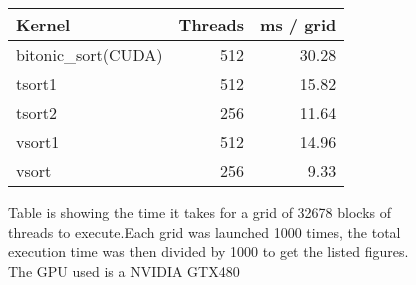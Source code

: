 

\begin{figure}
\begin{center}
  \begin{tabular}{  l | r | r}
    Kernel               & Threads   & ms / grid   \\ \hline
    bitonic\_sort(CUDA)  & 512       & 30.28       \\      
    tsort1               & 512       & 15.82       \\
    tsort2               & 256       & 11.64       \\ 
    vsort1               & 512       & 14.96       \\ 
    vsort                & 256       &  9.33       \\ 
  \end{tabular}
\end{center}
\label{fig:table}
\caption{Table is showing the time it takes for a grid of 32678 blocks of 
threads to execute.Each grid was launched 1000 times, the total execution time 
was then divided by 1000 to get the listed figures. The GPU used is a NVIDIA GTX480} 
\end{figure}
